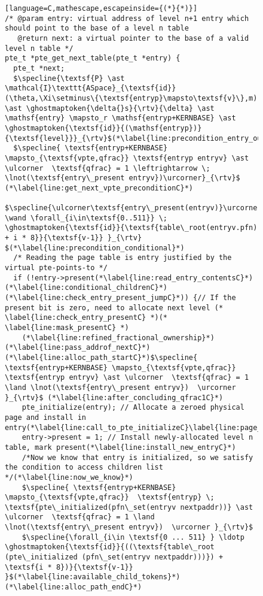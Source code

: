 \begin{figure}\footnotesize
\ifPLDI
\begin{lstlisting}[language=C,mathescape,escapeinside={(*}{*)}]
/* @param entry: virtual address of level n+1 entry which should point to the base of a level n table
   @return next: a virtual pointer to the base of a valid level n table */
pte_t *pte_get_next_table(pte_t *entry) {
  pte_t *next;
  $\specline{\textsf{P} \ast \mathcal{I}\texttt{ASpace}_{\textsf{id}}(\theta,\Xi\setminus\{\textsf{entryp}\mapsto\textsf{v}\},m) \ast \ghostmaptoken{\delta{}s}{\rtv}{\delta} \ast \mathsf{entry} \mapsto_r \mathsf{entryp+KERNBASE} \ast \ghostmaptoken{\textsf{id}}{(\mathsf{entryp})}{\textsf{level}}}_{\rtv}$(*\label{line:precondition_entry_out}*)
  $\specline{ \textsf{entryp+KERNBASE} \mapsto_{\textsf{vpte,qfrac}} \textsf{entryp entryv} \ast \ulcorner  \textsf{qfrac} = 1 \leftrightarrow \; \lnot(\textsf{entry\_present entryv})\urcorner}_{\rtv}$ (*\label{line:get_next_vpte_preconditionC}*)
  $\specline{\ulcorner\textsf{entry\_present(entryv)}\urcorner \wand \forall_{i\in\textsf{0..511}} \; \ghostmaptoken{\textsf{id}}{\textsf{table\_root(entryv.pfn) + i * 8}}{\textsf{v-1}} }_{\rtv} $(*\label{line:precondition_conditional}*) 
  /* Reading the page table is entry justified by the virtual pte-points-to */
  if (!entry->present(*\label{line:read_entry_contentsC}*)(*\label{line:conditional_childrenC}*)(*\label{line:check_entry_present_jumpC}*)) {// If the present bit is zero, need to allocate next level (* \label{line:check_entry_presentC} *)(* \label{line:mask_presentC} *) 
    (*\label{line:refined_fractional_ownership}*)(*\label{line:pass_addrof_nextC}*)(*\label{line:alloc_path_startC}*)$\specline{ \textsf{entryp+KERNBASE} \mapsto_{\textsf{vpte,qfrac}} \textsf{entryp entryv} \ast \ulcorner  \textsf{qfrac} = 1 \land \lnot(\textsf{entry\_present entryv})  \urcorner }_{\rtv}$ (*\label{line:after_concluding_qfrac1C}*)
    pte_initialize(entry); // Allocate a zeroed physical page and install in entry(*\label{line:call_to_pte_initializeC}\label{line:page_of_capsC}*)
    entry->present = 1; // Install newly-allocated level n table, mark present(*\label{line:install_new_entryC}*)
    /*Now we know that entry is initialized, so we satisfy the condition to access children list */(*\label{line:now_we_know}*)
    $\specline{ \textsf{entryp+KERNBASE} \mapsto_{\textsf{vpte,qfrac}}  \textsf{entryp} \; \textsf{pte\_initialized(pfn\_set(entryv nextpaddr))} \ast \ulcorner  \textsf{qfrac} = 1 \land \lnot(\textsf{entry\_present entryv})  \urcorner }_{\rtv}$
    $\specline{\forall_{i\in \textsf{0 ... 511} } \ldotp  \ghostmaptoken{\textsf{id}}{((\textsf{table\_root (pte\_initialized (pfn\_set(entryv nextpaddr)))}) + \textsf{i * 8})}{\textsf{v-1}}  }$(*\label{line:available_child_tokens}*) (*\label{line:alloc_path_endC}*)

\end{lstlisting}
\end{figure}
